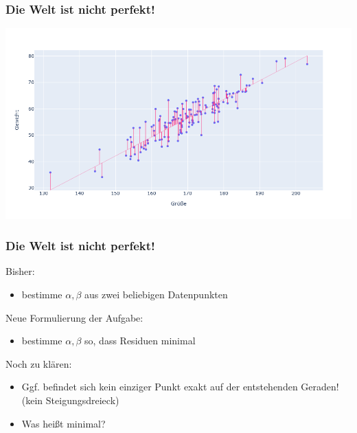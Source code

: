
\begin{frame}
\frametitle{Die Welt ist nicht perfekt!}

\begin{center}
	\includegraphics[width=\linewidth]{fig8/still-artifical.png}
\end{center}

\end{frame}


\begin{frame}
\frametitle{Die Welt ist nicht perfekt!}

Bisher:
\begin{itemize}
	\item bestimme $\alpha, \beta$ aus zwei beliebigen Datenpunkten
\end{itemize}

Neue Formulierung der Aufgabe:
\begin{itemize}
	\item bestimme $\alpha, \beta$ so, dass Residuen \alert{minimal}
\end{itemize}

Noch zu klären:
\begin{itemize}
	\item Ggf. befindet sich kein einziger Punkt exakt auf der entstehenden Geraden! (kein Steigungsdreieck)
	\item Was heißt minimal?
\end{itemize}

\end{frame}


